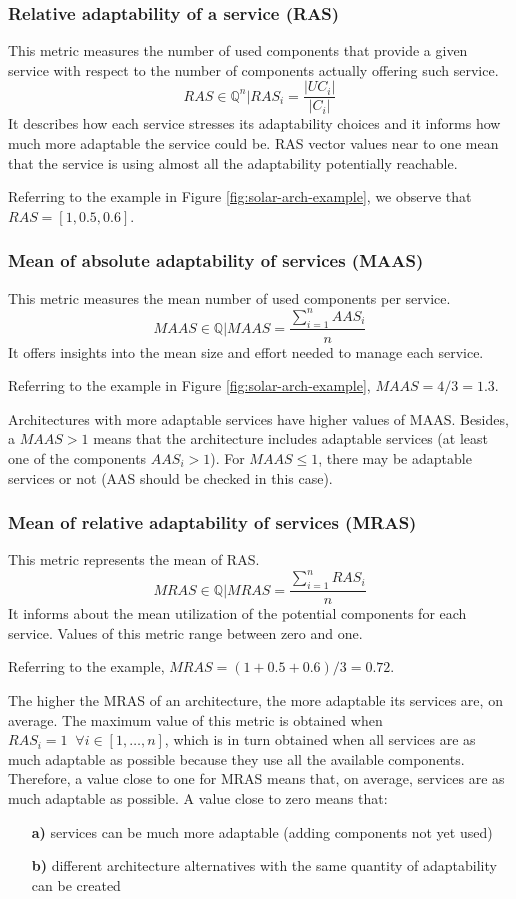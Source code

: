 \subsubsection{Relative adaptability of a service (RAS)}
This metric measures the number of used components that provide a given service with respect to the number of components actually offering such service.
\[ RAS \in \mathbb{Q}^n | RAS_i = \frac{|UC_i|}{|C_i|} \]
It describes how each service stresses its adaptability choices and it informs how much more adaptable the service could be. RAS vector values near to one mean that the service is using almost all the adaptability potentially reachable. 

\noindent Referring to the example in Figure \ref{fig:solar-arch-example}, we observe that $RAS = [1, 0.5, 0.6]$.

\subsubsection{Mean of absolute adaptability of services (MAAS)}
This metric measures the mean number of used components per service.
\[ MAAS \in \mathbb{Q} | MAAS = \frac{\sum_{i=1}^{n} AAS_i}{n}  \]
It offers insights into the mean size and effort needed to manage each service.

\noindent Referring to the example in Figure \ref{fig:solar-arch-example}, $MAAS = 4/3 = 1.3$. 

Architectures with more adaptable services have higher values of MAAS. Besides, a $MAAS > 1$ means that the architecture includes adaptable services (at least one of the components $AAS_i > 1$). For $MAAS \le 1$, there may be adaptable services or not (AAS should be checked in this case).

\subsubsection{Mean of relative adaptability of services (MRAS)}
This metric represents the mean of RAS.
\[ MRAS \in \mathbb{Q} | MRAS = \frac{\sum_{i=1}^{n}RAS_i}{n}\]
It informs about the mean utilization of the potential components for each service. Values of this metric range between zero and one.

\noindent Referring to the example, $MRAS = (1 + 0.5 + 0.6)/3 = 0.72$.

The higher the MRAS of an architecture, the more adaptable its services are, on average. The maximum value of this metric is obtained when $RAS_i = 1 \;\;\forall i \in [1, \dots, n]$, which is in turn obtained when all services are as much adaptable as possible because they use all the available components. Therefore, a value close to one for MRAS means that, on average, services are as much adaptable as possible. A value close to zero means that: 
\begin{enumerate}
	\item[\textbf{a)}] services can be much more adaptable (adding components not yet used)
	\item[\textbf{b)}] different architecture alternatives with the same quantity of adaptability can be created
\end{enumerate}

